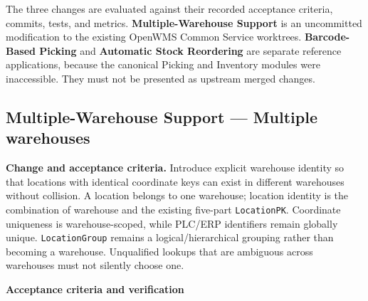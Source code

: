 \documentclass[11pt,a4paper]{article}
\newcommand{\code}[1]{\nolinkurl{#1}}
\begin{document}
The three changes are evaluated against their recorded acceptance criteria, commits, tests, and metrics. \textbf{Multiple-Warehouse Support} is an uncommitted modification to the existing OpenWMS Common Service worktrees. \textbf{Barcode-Based Picking} and \textbf{Automatic Stock Reordering} are separate reference applications, because the canonical Picking and Inventory modules were inaccessible. They must not be presented as upstream merged changes.

\subsection{\textbf{Multiple-Warehouse Support} --- Multiple warehouses}

\textbf{Change and acceptance criteria.} Introduce explicit warehouse identity so that locations with identical coordinate keys can exist in different warehouses without collision. A location belongs to one warehouse; location identity is the combination of warehouse and the existing five-part \code{LocationPK}. Coordinate uniqueness is warehouse-scoped, while PLC/ERP identifiers remain globally unique. \code{LocationGroup} remains a logical/hierarchical grouping rather than becoming a warehouse. Unqualified lookups that are ambiguous across warehouses must not silently choose one.

\textbf{Acceptance criteria and verification}
\end{document}
